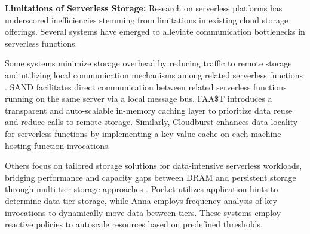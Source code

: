 


\textbf{Limitations of Serverless Storage:} Research on serverless platforms has underscored inefficiencies stemming from limitations in existing cloud storage offerings. Several systems have emerged to alleviate communication bottlenecks in serverless functions.

Some systems minimize storage overhead by reducing traffic to remote storage and utilizing local communication mechanisms among related serverless functions \cite{akkus2018sand,romero2021faat}. SAND \cite{akkus2018sand} facilitates direct communication between related serverless functions running on the same server via a local message bus. FAA\$T \cite{romero2021faat} introduces a transparent and auto-scalable in-memory caching layer to prioritize data reuse and reduce calls to remote storage. Similarly, Cloudburst \cite{Sreekanti_2020} enhances data locality for serverless functions by implementing a key-value cache on each machine hosting function invocations.

Others focus on tailored storage solutions for data-intensive serverless workloads, bridging performance and capacity gaps between DRAM and persistent storage through multi-tier storage approaches \cite{klimovic2018pocket,wu2019autoscaling}. Pocket \cite{klimovic2018pocket} utilizes application hints to determine data tier storage, while Anna \cite{wu2019autoscaling} employs frequency analysis of key invocations to dynamically move data between tiers. These systems employ reactive policies to autoscale resources based on predefined thresholds.

